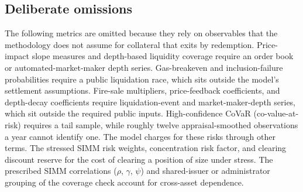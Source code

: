 \subsection{Deliberate omissions}\label{sec:taxonomy-omitted}
The following metrics are omitted because they rely on observables that the methodology does not assume for collateral that exits by redemption. Price-impact slope measures and depth-based liquidity coverage require an order book or automated-market-maker depth series. Gas-breakeven and inclusion-failure probabilities require a public liquidation race, which sits outside the model's settlement assumptions. Fire-sale multipliers, price-feedback coefficients, and depth-decay coefficients require liquidation-event and market-maker-depth series, which sit outside the required public inputs. High-confidence CoVaR (co-value-at-risk) requires a tail sample, while roughly twelve appraisal-smoothed observations a year cannot identify one. The model charges for these risks through other terms. The stressed SIMM risk weights, concentration risk factor, and clearing discount reserve for the cost of clearing a position of size under stress. The prescribed SIMM correlations ($\rho$, $\gamma$, $\psi$) and shared-issuer or administrator grouping of the coverage check account for cross-asset dependence.
